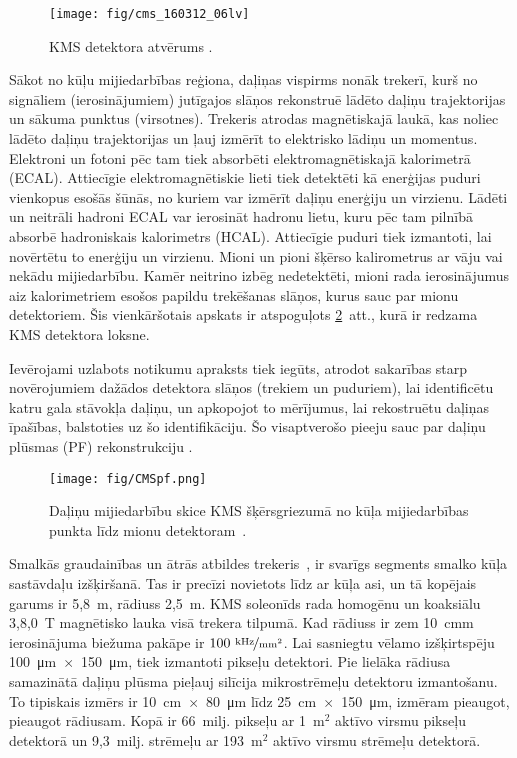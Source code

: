 \begin{figure}[hbtp]
\centering
\def\twidth{1}
\texttt{[image: fig/cms\_160312\_06lv]}
\caption{KMS detektora atvērums \cite{Sakuma:2013jqa}.}
\label{fig:CMS_detector}
\end{figure}

Sākot no kūļu mijiedarbības reģiona, daļiņas vispirms nonāk trekerī, kurš no signāliem (\gls{ierosinājumiem}) jutīgajos slāņos rekonstruē lādēto daļiņu trajektorijas un sākuma punktus (\gls{virsotnes}). Trekeris atrodas magnētiskajā laukā, kas noliec lādēto daļiņu trajektorijas un ļauj izmērīt to elektrisko lādiņu un momentus. Elektroni un fotoni pēc tam tiek absorbēti elektromagnētiskajā kalorimetrā (ECAL). Attiecīgie elektromagnētiskie lieti tiek detektēti kā enerģijas \gls{puduri} vienkopus esošās šūnās, no kuriem var izmērīt daļiņu enerģiju un virzienu. Lādēti un neitrāli hadroni ECAL var ierosināt hadronu lietu, kuru pēc tam pilnībā absorbē hadroniskais kalorimetrs (HCAL). Attiecīgie puduri tiek izmantoti, lai novērtētu to enerģiju un virzienu.  Mioni un pioni šķērso kalirometrus ar vāju vai nekādu mijiedarbību. Kamēr neitrino izbēg nedetektēti, mioni rada ierosinājumus aiz kalorimetriem esošos papildu trekēšanas slāņos, kurus sauc par mionu detektoriem. Šis vienkāršotais apskats ir atspoguļots \ref{fig:CMSpf}~att., kurā ir redzama KMS detektora loksne.

Ievērojami uzlabots notikumu apraksts tiek iegūts, atrodot sakarības starp novērojumiem dažādos detektora slāņos (trekiem un puduriem), lai identificētu katru \gls{gala stāvokļa} daļiņu, un apkopojot to mērījumus, lai rekostruētu daļiņas īpašības, balstoties uz šo identifikāciju. Šo visaptverošo pieeju sauc par \gls{daļiņu plūsmas} (PF) rekonstrukciju \cite{Sirunyan:2017ulk}.

\begin{figure}[h]
  \centering
  \texttt{[image: fig/CMSpf.png]}
  \caption{Daļiņu mijiedarbību skice KMS šķērsgriezumā no kūļa mijiedarbības punkta līdz mionu detektoram~\cite{Sirunyan:2017ulk}.}
  \label{fig:CMSpf}
\end{figure}

Smalkās \gls{graudainības} un ātrās atbildes trekeris~\cite{Karimaki:368412}, \cite{tracker_addendum} ir svarīgs segments smalko kūļa sastāvdaļu izšķiršanā. Tas ir precīzi novietots līdz ar kūļa asi, un tā kopējais garums ir 5,8~m, rādiuss 2,5~m. KMS soleonīds rada homogēnu un koaksiālu 3,8,0~T magnētisko lauka visā trekera tilpumā. Kad rādiuss ir zem 10~cmm ierosinājuma biežuma pakāpe ir $100~\nicefrac{\text{kHz}}{\text{mm}^2}$. Lai sasniegtu vēlamo izšķirtspēju \SI{100}{\um}~$\times$~\SI{150}{\um}, tiek izmantoti pikseļu detektori. Pie lielāka rādiusa samazinātā daļiņu plūsma pieļauj silīcija mikrostrēmeļu detektoru izmantošanu. To tipiskais izmērs ir \SI{10}{cm}~$\times$~\SI{80}{\um} līdz \SI{25}{cm}~$\times$~\SI{150}{\um}, izmēram pieaugot, pieaugot rādiusam. Kopā ir 66~milj. pikseļu ar 1~$\text{m}^2$ aktīvo virsmu pikseļu detektorā un 9,3~milj. strēmeļu ar 193~m${}^2$ aktīvo virsmu strēmeļu detektorā.

